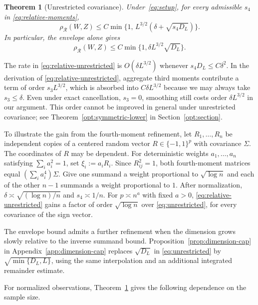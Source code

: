 \documentclass[11pt,letterpaper]{article}
\newenvironment{recovered}{}{}
\newtheorem{theorem}{Theorem}
\theoremstyle{remark}
\newcommand{\rh}{\rho_{\mathcal R}}
\begin{document}
\begin{theorem}[Unrestricted covariance]\label{thm:unrestricted}
Under~\eqref{eq:setup}, for every admissible $s_4$ in \eqref{eq:relative-moments},
\begin{equation}\label{eq:relative-unrestricted}
 \rh(W,Z)\le C\min\{1,\,L^{3/2}(\delta+\sqrt{s_4D_L})\}.
\end{equation}
In particular, the envelope alone gives
\begin{equation}
 \rh(W,Z)\le C\min\{1,\delta L^{3/2}\sqrt{D_L}\}.
 \label{eq:unrestricted}
\end{equation}
\end{theorem}
\begin{recovered}
The rate in \eqref{eq:relative-unrestricted} is \(O(\delta L^{3/2})\)
whenever \({s_4D_L\le C\delta^2}\). In the derivation of
\eqref{eq:relative-unrestricted}, aggregate third moments contribute a
term of order \(s_3L^{3/2}\), which is absorbed into
\(C\delta L^{3/2}\) because we may always take \(s_3\le\delta\).
Even under exact cancellation, \(s_3=0\), smoothing still costs order
\(\delta L^{3/2}\) in our argument. This order cannot be improved in
general under unrestricted covariance; see
Theorem~\ref{opt:symmetric-lower} in Section~\ref{opt:section}.
\end{recovered}

{To illustrate the gain from the fourth-moment
refinement, let \(R_1,\ldots,R_n\) be independent copies of a centered
random vector \(R\in\{-1,1\}^p\) with covariance \(\Sigma\). The
coordinates of \(R\) may be dependent. For deterministic weights
\(a_1,\ldots,a_n\) satisfying \(\sum_i a_i^2=1\), set
\(\xi_i:=a_iR_i\).} Since $R_{ij}^2=1$, both fourth-moment matrices equal $(\sum_i a_i^4)\Sigma$. {Give one summand a weight proportional to $\sqrt{\log n}$ and each of the other $n-1$ summands a weight proportional to $1$.} After normalization, $\delta\asymp\sqrt{(\log n)/n}$ and $s_4\asymp1/n$. For $p\asymp n^a$ with fixed $a>0$, \eqref{eq:relative-unrestricted} gains a factor of order $\sqrt{\log n}$ over \eqref{eq:unrestricted}, for every covariance of the sign vector.

The envelope bound admits a further refinement when the dimension grows
slowly relative to the inverse summand bound. Proposition~\ref{prop:dimension-cap}
in Appendix~\ref{app:dimension-cap} replaces \(\sqrt{D_L}\) in
\eqref{eq:unrestricted} by \(\sqrt{\min\{D_L,L\}}\), using the same
interpolation and an additional integrated remainder estimate.

For normalized observations, Theorem~\ref{thm:unrestricted} gives
the following dependence on the sample size.
\end{document}
